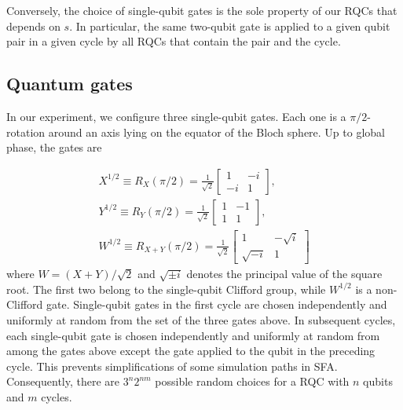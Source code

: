 Conversely, the choice of single-qubit gates is the sole property of our RQCs that depends on $s$. In particular, the same two-qubit gate is applied to a given qubit pair in a given cycle by all RQCs that contain the pair and the cycle.

\subsection{Quantum gates}\label{subsec:quantum_gates}
In our experiment, we configure three single-qubit gates. Each one is a $\pi/2$-rotation around an axis lying on the equator of the Bloch sphere. Up to global phase, the gates are

\begin{align}
X^{1/2} \equiv R_X(\pi / 2) = \frac{1}{\sqrt{2}} \begin{bmatrix}
1  & -i \\
-i &  1 
\end{bmatrix}, \\
Y^{1/2} \equiv R_Y(\pi / 2) = \frac{1}{\sqrt{2}} \begin{bmatrix}
1 & -1 \\
1 &  1 
\end{bmatrix}, \\
W^{1/2} \equiv R_{X+Y}(\pi / 2) = \frac{1}{\sqrt{2}} \begin{bmatrix}
1  & -\sqrt{i} \\
\sqrt{-i} &  1
\end{bmatrix}
\end{align}
where $W = (X + Y)/\sqrt{2}$ and $\sqrt{\pm i}$ denotes the principal value of the square root. The first two belong to the single-qubit Clifford group, while $W^{1/2}$ is a non-Clifford gate. Single-qubit gates in the first cycle are chosen independently and uniformly at random from the set of the three gates above. In subsequent cycles, each single-qubit gate is chosen independently and uniformly at random from among the gates above except the gate applied to the qubit in the preceding cycle. This prevents simplifications of some simulation paths in SFA. Consequently, there are $3^n 2^{nm}$ possible random choices for a RQC with $n$ qubits and $m$ cycles.

